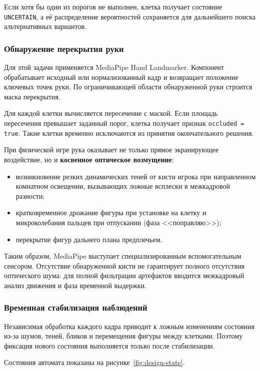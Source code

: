 Если хотя бы один из порогов не выполнен, клетка получает состояние \texttt{UNCERTAIN}, а её распределение вероятностей сохраняется для дальнейшего поиска альтернативных вариантов.

\subsubsection{Обнаружение перекрытия руки}

Для этой задачи применяется MediaPipe Hand Landmarker. Компонент обрабатывает исходный или нормализованный кадр и возвращает положение ключевых точек руки. По ограничивающей области обнаруженной руки строится маска перекрытия.

Для каждой клетки вычисляется пересечение с маской. Если площадь пересечения превышает заданный порог, клетка получает признак \texttt{occluded = true}. Такие клетки временно исключаются из принятия окончательного решения.

При физической игре рука оказывает не только прямое экранирующее воздействие, но и \textbf{косвенное оптическое возмущение}:
\begin{itemize}
    \item возникновение резких динамических теней от кисти игрока при направленном комнатном освещении, вызывающих ложные всплески в межкадровой разности;
    \item кратковременное дрожание фигуры при установке на клетку и микроколебания пальцев при отпускании (фаза <<поправляю>>);
    \item перекрытие фигур дальнего плана предплечьем.
\end{itemize}

Таким образом, MediaPipe выступает специализированным вспомогательным сенсором. Отсутствие обнаруженной кисти не гарантирует полного отсутствия оптического шума: для полной фильтрации артефактов вводится межкадровый анализ движения и фаза временной выдержки.

\subsubsection{Временная стабилизация наблюдений}

Независимая обработка каждого кадра приводит к ложным изменениям состояния из-за шумов, теней, бликов и перемещения фигуры между клетками. Поэтому фиксация нового состояния выполняется только после стабилизации.

Состояния автомата показаны на рисунке~\ref{fig:design-state}.

